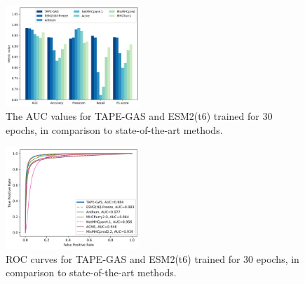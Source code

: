 \begin{figure}
	\includegraphics[width=0.45\textwidth]{../img/results/metrics_comparison}
	\caption{The AUC values for TAPE-GAS and ESM2(t6) trained for 30 epochs, in comparison to state-of-the-art methods.}
	\label{fig:comparison_final}
\end{figure}

\begin{figure}
	\includegraphics[width=0.45\textwidth]{../img/results/ROC_comparison}
	\caption{ROC curves for TAPE-GAS and ESM2(t6) trained for 30 epochs, in comparison to state-of-the-art methods.}
	\label{fig:ROC_comparison_final}
\end{figure}


